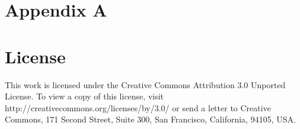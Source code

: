 \documentclass[11pt]{report}
\begin{document}
\chapter*{Appendix A}

\nocite{*}
{\small


}

\chapter*{License}

This work is licensed under the Creative Commons Attribution 3.0 Unported License. To view a copy of this license, visit http://creativecommons.org/licenses/by/3.0/ or send a letter to Creative Commons, 171 Second Street, Suite 300, San Francisco, California, 94105, USA.
\end{document}
